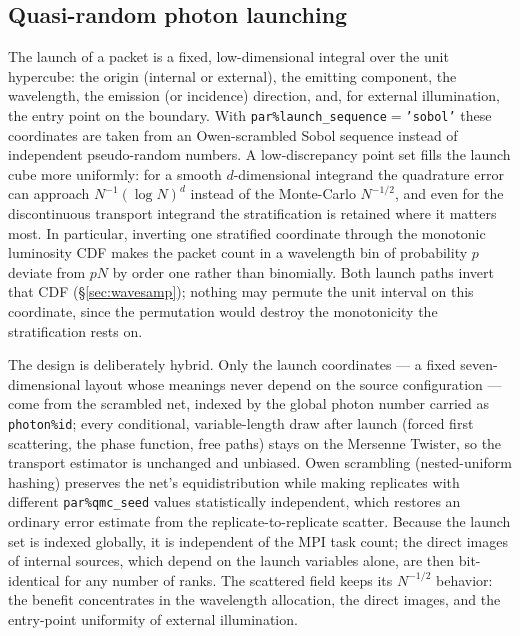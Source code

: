 \documentclass[english,a4paper]{kiseon_memo}
\newcommand{\code}[1]{\texttt{#1}}
\newcommand{\pp}[1]{\texttt{par\%#1}}
\begin{document}
\subsection{Quasi-random photon launching}\label{sec:qmc}
The launch of a packet is a fixed, low-dimensional integral over the unit
hypercube: the origin (internal or external), the emitting component, the
wavelength, the emission (or incidence) direction, and, for external
illumination, the entry point on the boundary.  With
\pp{launch\_sequence}${}=$\code{'sobol'} these coordinates are taken from an
Owen-scrambled Sobol sequence instead of independent pseudo-random numbers.  A
low-discrepancy point set fills the launch cube more uniformly: for a smooth
$d$-dimensional integrand the quadrature error can approach
$N^{-1}(\log N)^{d}$ instead of the Monte-Carlo $N^{-1/2}$, and even for the
discontinuous transport integrand the stratification is retained where it
matters most.  In particular, inverting one stratified coordinate through the
monotonic luminosity CDF makes the packet count in a wavelength bin of
probability $p$ deviate from $pN$ by order one rather than binomially.  Both
launch paths invert that CDF (\S\ref{sec:wavesamp}); nothing may permute the
unit interval on this coordinate, since the permutation would destroy the
monotonicity the stratification rests on.

The design is deliberately hybrid.  Only the launch coordinates --- a fixed
seven-dimensional layout whose meanings never depend on the source
configuration --- come from the scrambled net, indexed by the global photon
number carried as \code{photon\%id}; every conditional, variable-length draw
after launch (forced first scattering, the phase function, free paths) stays
on the Mersenne Twister, so the transport estimator is unchanged and
unbiased.  Owen scrambling (nested-uniform hashing) preserves the net's
equidistribution while making replicates with different \pp{qmc\_seed} values
statistically independent, which restores an ordinary error estimate from the
replicate-to-replicate scatter.  Because the launch set is indexed globally,
it is independent of the MPI task count; the direct images of internal
sources, which depend on the launch variables alone, are then bit-identical
for any number of ranks.  The scattered field keeps its $N^{-1/2}$ behavior:
the benefit concentrates in the wavelength allocation, the direct images, and
the entry-point uniformity of external illumination.

\end{document}
